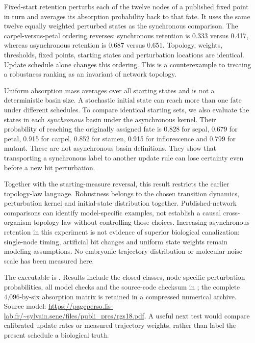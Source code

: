Fixed-start retention perturbs each of the twelve nodes of a published fixed point in turn and averages its absorption probability back to that fate. It uses the same twelve equally weighted perturbed states as the synchronous comparison. The carpel-versus-petal ordering reverses: synchronous retention is 0.333 versus 0.417, whereas asynchronous retention is 0.687 versus 0.651. Topology, weights, thresholds, fixed points, starting states and perturbation locations are identical. Update schedule alone changes this ordering. This is a counterexample to treating a robustness ranking as an invariant of network topology.

Uniform absorption mass averages over all starting states and is not a deterministic basin size. A stochastic initial state can reach more than one fate under different schedules. To compare identical starting sets, we also evaluate the states in each \emph{synchronous} basin under the asynchronous kernel. Their probability of reaching the originally assigned fate is 0.828 for sepal, 0.679 for petal, 0.915 for carpel, 0.852 for stamen, 0.915 for inflorescence and 0.799 for mutant. These are not asynchronous basin definitions. They show that transporting a synchronous label to another update rule can lose certainty even before a new bit perturbation.

Together with the starting-measure reversal, this result restricts the earlier topology-law language. Robustness belongs to the chosen transition dynamics, perturbation kernel and initial-state distribution together. Published-network comparisons can identify model-specific examples, not establish a causal cross-organism topology law without controlling those choices. Increasing asynchronous retention in this experiment is not evidence of superior biological canalization: single-node timing, artificial bit changes and uniform state weights remain modeling assumptions. No embryonic trajectory distribution or molecular-noise scale has been measured here.

The executable is . Results include the closed classes, node-specific perturbation probabilities, all model checks and the source-code checksum in ; the complete 4,096-by-six absorption matrix is retained in a compressed numerical archive. Source model: \url{https://pageperso.lis-lab.fr/~sylvain.sene/files/publi_pres/rgs18.pdf}. A useful next test would compare calibrated update rates or measured trajectory weights, rather than label the present schedule a biological truth.
